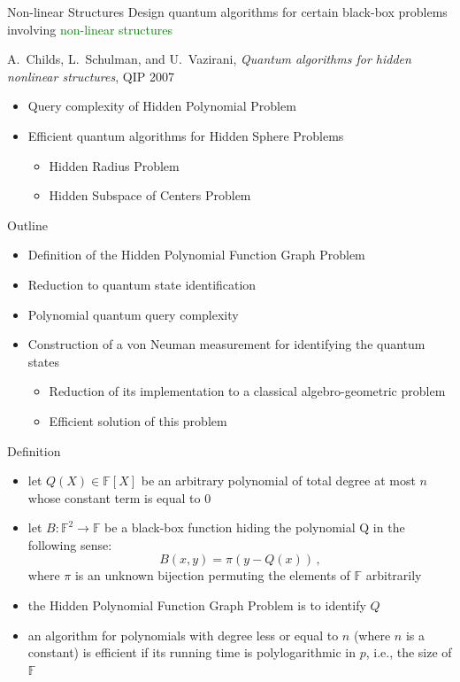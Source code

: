 \documentclass[slideColor]{prosper}
\newcommand{\F}{{\mathbb{F}}}
\renewcommand{\>}{\rangle}
\newcommand{\<}{\langle}
\begin{document}
\begin{slide}{Non-linear Structures}
Design quantum algorithms for certain black-box problems involving \textcolor{green}{non-linear structures}

\bigskip
A.~Childs, L.~Schulman, and U.~Vazirani, {\em Quantum algorithms for hidden nonlinear structures}, QIP 2007
\begin{itemize}
\item Query complexity of Hidden Polynomial Problem
\item Efficient quantum algorithms for Hidden Sphere Problems
\begin{itemize}
\item Hidden Radius Problem
\item Hidden Subspace of Centers Problem
\end{itemize}
\end{itemize}
\end{slide}


\begin{slide}{Outline}
\begin{itemize}
\item Definition of the Hidden Polynomial Function Graph Problem
\item Reduction to quantum state identification
\item Polynomial quantum query complexity
\item Construction of a von Neuman measurement for identifying the quantum states
\begin{itemize}
\item Reduction of its implementation to a classical algebro-geometric problem
\item Efficient solution of this problem
\end{itemize}
\end{itemize}
\end{slide}


\begin{slide}{Definition}
\begin{itemize}
\item let $Q(X)\in\F[X]$ be an arbitrary polynomial of total degree at most $n$ whose constant term is equal to $0$
\item let $B : \F^2 \rightarrow \F$ be a black-box function hiding the polynomial Q in the following sense:
\[
B(x,y)=\pi(y-Q(x))\,,
\]
where $\pi$ is an unknown bijection permuting the elements of $\F$ arbitrarily
\item the Hidden Polynomial Function Graph Problem is to identify $Q$
\item an algorithm for polynomials with degree less or equal to $n$ (where $n$ is a constant) is efficient if its running time is polylogarithmic in $p$, i.e., the size of $\F$
\end{itemize}
\end{slide}
\end{document}
